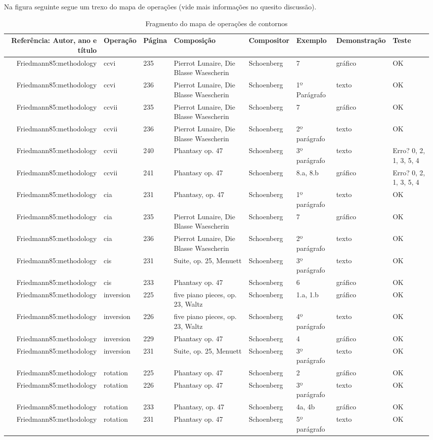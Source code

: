 \documentclass[11pt]{article}
\begin{document}
Na figura seguinte segue um trexo do mapa de operações (vide mais
informações
no quesito discussão).
\begin{table}
  \centering
  \begin{tabular}{r|lllllll}
    Referência: Autor, ano e título&Operação&Página&Composição&Compositor&Exemplo&Demonstração&Teste\\
    \hline
    Friedmann85:methodology&ccvi&235&Pierrot Lunaire, Die Blasse Waescherin&Schoenberg&7&gráfico&OK\\
    Friedmann85:methodology&ccvi&236&Pierrot Lunaire, Die Blasse Waescherin&Schoenberg&1º Parágrafo&texto&OK\\
    Friedmann85:methodology&ccvii&235&Pierrot Lunaire, Die Blasse Waescherin&Schoenberg&7&gráfico&OK\\
    Friedmann85:methodology&ccvii&236&Pierrot Lunaire, Die Blasse Waescherin&Schoenberg&2º parágrafo&texto&OK\\
    Friedmann85:methodology&ccvii&240&Phantasy op. 47&Schoenberg&3º parágrafo&texto&Erro? 0, 2, 1, 3, 5, 4\\
    Friedmann85:methodology&ccvii&241&Phantasy op. 47&Schoenberg&8.a, 8.b&gráfico&Erro? 0, 2, 1, 3, 5, 4\\
    Friedmann85:methodology&cia&231&Phantasy, op. 47&Schoenberg&1º parágrafo&texto&OK\\
    Friedmann85:methodology&cia&235&Pierrot Lunaire, Die Blasse Waescherin&Schoenberg&7&gráfico&OK\\
    Friedmann85:methodology&cia&236&Pierrot Lunaire, Die Blasse Waescherin&Schoenberg&2º parágrafo&texto&OK\\
    Friedmann85:methodology&cis&231&Suite, op. 25, Menuett&Schoenberg&3º parágrafo&texto&OK\\
    Friedmann85:methodology&cis&233&Phantasy op. 47&Schoenberg&6&gráfico&OK\\
    Friedmann85:methodology&inversion&225&five piano pieces, op. 23, Waltz&Schoenberg&1.a, 1.b&gráfico&OK\\
    Friedmann85:methodology&inversion&226&five piano pieces, op. 23, Waltz&Schoenberg&4º parágrafo&texto&OK\\
    Friedmann85:methodology&inversion&229&Phantasy op. 47&Schoenberg&4&gráfico&OK\\
    Friedmann85:methodology&inversion&231&Suite, op. 25, Menuett&Schoenberg&3º parágrafo&texto&OK\\
    Friedmann85:methodology&rotation&225&Phantasy op. 47&Schoenberg&2&gráfico&OK\\
    Friedmann85:methodology&rotation&226&Phantasy op. 47&Schoenberg&3º parágrafo&texto&OK\\
    Friedmann85:methodology&rotation&233&Phantasy, op. 47&Schoenberg&4a, 4b&gráfico&OK\\
    Friedmann85:methodology&rotation&231&Phantasy op. 47&Schoenberg&5º parágrafo&texto&OK\\
  \end{tabular}
  \caption{Fragmento do mapa de operações de contornos}
  \label{tab:mapa-operacoes}
\end{table}
\end{document}
